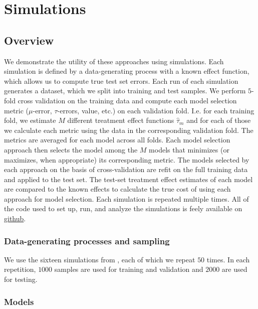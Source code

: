 \section{Simulations}
\label{simulations}

\subsection{Overview}

We demonstrate the utility of these approaches using simulations. Each simulation is defined by a data-generating process with a known effect function, which allows us to compute true test set errors. Each run of each simulation generates a dataset, which we split into training and test samples. We perform $5$-fold cross validation on the training data and compute each model selection metric ($\mu$-error, $\tau$-errors, value, etc.) on each validation fold. I.e. for each training fold, we estimate $M$ different treatment effect functions $\hat\tau_m$ and for each of those we calculate each metric using the data in the corresponding validation fold. The metrics are averaged for each model across all folds. Each model selection approach then selects the model among the $M$ models that minimizes (or maximizes, when appropriate) its corresponding metric. The models selected by each approach on the basis of cross-validation are refit on the full training data and applied to the test set. The test-set treatment effect estimates of each model are compared to the known effects to calculate the true cost of using each approach for model selection. Each simulation is repeated multiple times. All of the code used to set up, run, and analyze the simulations is feely available on \href{https://github.com/som-shahlab/ITE-model-selection}{github}.

\subsubsection{Data-generating processes and sampling}

We use the sixteen simulations from \citet{Powers:2017wd}, each of which we repeat $50$ times. In each repetition, $1000$ samples are used for training and validation and $2000$ are used for testing. 

\subsubsection{Models}

